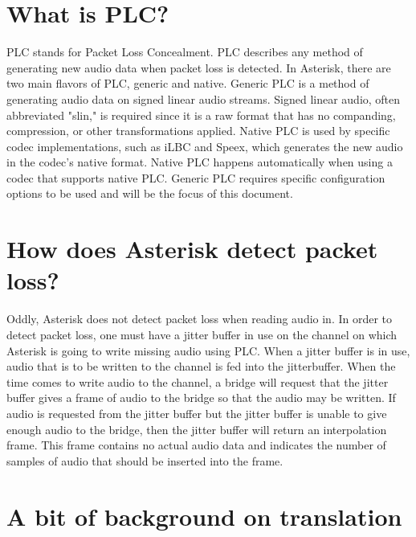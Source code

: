 \section{What is PLC?}

	PLC stands for Packet Loss Concealment. PLC describes any method of generating
new audio data when packet loss is detected. In Asterisk, there are two main flavors
of PLC, generic and native. Generic PLC is a method of generating audio data on
signed linear audio streams. Signed linear audio, often abbreviated "slin," is required
since it is a raw format that has no companding, compression, or other transformations
applied. Native PLC is used by specific codec implementations, such as
iLBC and Speex, which generates the new audio in the codec's native format. Native
PLC happens automatically when using a codec that supports native PLC. Generic PLC
requires specific configuration options to be used and will be the focus of this
document.

\section{How does Asterisk detect packet loss?}

	Oddly, Asterisk does not detect packet loss when reading audio in. In order to
detect packet loss, one must have a jitter buffer in use on the channel on which
Asterisk is going to write missing audio using PLC. When a jitter buffer is in use,
audio that is to be written to the channel is fed into the jitterbuffer. When the
time comes to write audio to the channel, a bridge will request that the jitter
buffer gives a frame of audio to the bridge so that the audio may be written. If
audio is requested from the jitter buffer but the jitter buffer is unable to give
enough audio to the bridge, then the jitter buffer will return an interpolation
frame. This frame contains no actual audio data and indicates the number of samples
of audio that should be inserted into the frame.

\section{A bit of background on translation}

